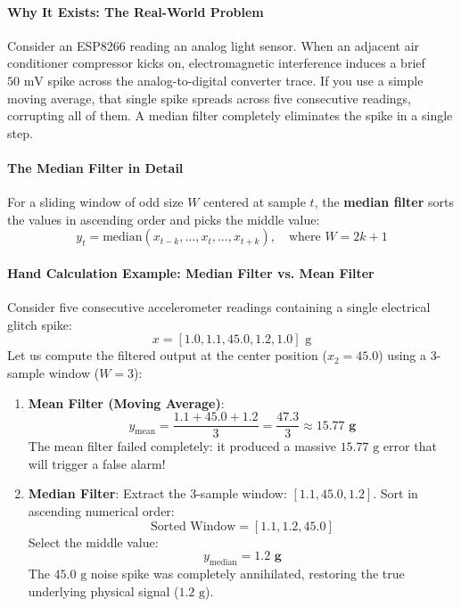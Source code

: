 \paragraph{Why It Exists: The Real-World Problem}
Consider an ESP8266 reading an analog light sensor. When an adjacent air conditioner compressor kicks on, electromagnetic interference induces a brief $50\text{ mV}$ spike across the analog-to-digital converter trace. If you use a simple moving average, that single spike spreads across five consecutive readings, corrupting all of them. A median filter completely eliminates the spike in a single step.

\paragraph{The Median Filter in Detail}
For a sliding window of odd size $W$ centered at sample $t$, the \textbf{median filter} sorts the values in ascending order and picks the middle value:
\begin{equation}
y_t = \text{median}(x_{t - k}, \dots, x_t, \dots, x_{t + k}), \quad \text{where } W = 2k + 1\label{eq:median_filter}
\end{equation}

\paragraph{Hand Calculation Example: Median Filter vs. Mean Filter}
Consider five consecutive accelerometer readings containing a single electrical glitch spike:
\begin{equation*}
x = [1.0, 1.1, 45.0, 1.2, 1.0]\text{ g}
\end{equation*}
Let us compute the filtered output at the center position ($x_2 = 45.0$) using a 3-sample window ($W=3$):
\begin{enumerate}
    \item \textbf{Mean Filter (Moving Average)}:
    \begin{equation*}
    y_{\text{mean}} = \frac{1.1 + 45.0 + 1.2}{3} = \frac{47.3}{3} \approx \mathbf{15.77\text{ g}}
    \end{equation*}
    The mean filter failed completely: it produced a massive $15.77\text{ g}$ error that will trigger a false alarm!
    \item \textbf{Median Filter}:
    Extract the 3-sample window: $[1.1, 45.0, 1.2]$.
    Sort in ascending numerical order:
    \begin{equation*}
    \text{Sorted Window} = [1.1, \mathbf{1.2}, 45.0]
    \end{equation*}
    Select the middle value:
    \begin{equation*}
    y_{\text{median}} = \mathbf{1.2\text{ g}}
    \end{equation*}
    The $45.0\text{ g}$ noise spike was completely annihilated, restoring the true underlying physical signal ($1.2\text{ g}$).
\end{enumerate}

